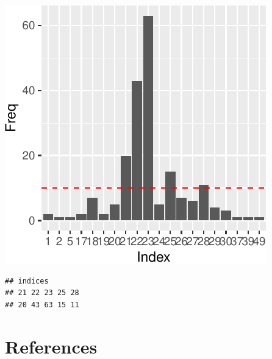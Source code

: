 \documentclass[smallextended]{svjour3}       %
\begin{document}
\begin{center}\includegraphics{springer_template_files/figure-latex/unnamed-chunk-10-1} \end{center}

\begin{verbatim}
## indices
## 21 22 23 25 28 
## 20 43 63 15 11
\end{verbatim}

\section{References}\label{references}



\end{document}
